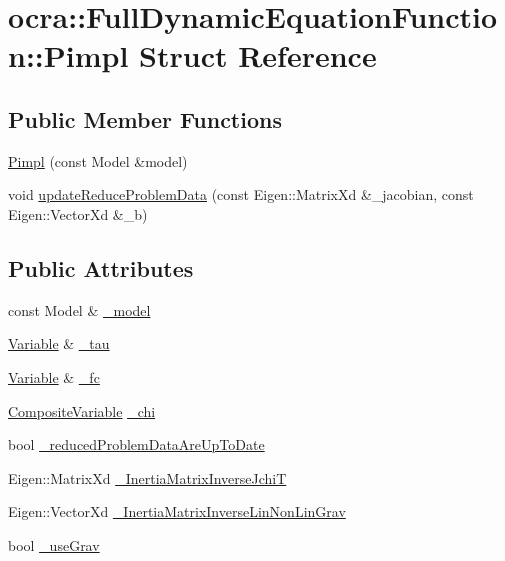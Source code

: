 \hypertarget{structFullDynamicEquationFunction_1_1Pimpl}{}\section{ocra\+:\+:Full\+Dynamic\+Equation\+Function\+:\+:Pimpl Struct Reference}
\label{structFullDynamicEquationFunction_1_1Pimpl}
\subsection*{Public Member Functions}
\begin{DoxyCompactItemize}
\item 
\hyperlink{structFullDynamicEquationFunction_1_1Pimpl_acc3b35606d52aa163f27d80f49cb3aaf}{Pimpl} (const Model \&model)
\item 
void \hyperlink{structFullDynamicEquationFunction_1_1Pimpl_a4d1df4cadec603942aeb750212a2d258}{update\+Reduce\+Problem\+Data} (const Eigen\+::\+Matrix\+Xd \&\+\_\+jacobian, const Eigen\+::\+Vector\+Xd \&\+\_\+b)
\end{DoxyCompactItemize}
\subsection*{Public Attributes}
\begin{DoxyCompactItemize}
\item 
const Model \& \hyperlink{structFullDynamicEquationFunction_1_1Pimpl_a180b0f0401cc9ff23b24d974823215d9}{\+\_\+model}
\item 
\hyperlink{classocra_1_1Variable}{Variable} \& \hyperlink{structFullDynamicEquationFunction_1_1Pimpl_a952d62f65cebf67e50d0d6a091f937c4}{\+\_\+tau}
\item 
\hyperlink{classocra_1_1Variable}{Variable} \& \hyperlink{structFullDynamicEquationFunction_1_1Pimpl_ab19caa3b14b35bba6a5dc5ea490cb7b4}{\+\_\+fc}
\item 
\hyperlink{classocra_1_1CompositeVariable}{Composite\+Variable} \hyperlink{structFullDynamicEquationFunction_1_1Pimpl_a795bb07591fdf52c4b60cccfb6b3e811}{\+\_\+chi}
\item 
bool \hyperlink{structFullDynamicEquationFunction_1_1Pimpl_a2712281ce355bde0730d888d8e92b2f8}{\+\_\+reduced\+Problem\+Data\+Are\+Up\+To\+Date}
\item 
Eigen\+::\+Matrix\+Xd \hyperlink{structFullDynamicEquationFunction_1_1Pimpl_a66a532ac843e6bb0255918262e48a947}{\+\_\+\+Inertia\+Matrix\+Inverse\+JchiT}
\item 
Eigen\+::\+Vector\+Xd \hyperlink{structFullDynamicEquationFunction_1_1Pimpl_a5b5154c8b3e5725507192b9055e2b298}{\+\_\+\+Inertia\+Matrix\+Inverse\+Lin\+Non\+Lin\+Grav}
\item 
bool \hyperlink{structFullDynamicEquationFunction_1_1Pimpl_a7a8eb59e31eca20e45bd63f2975ff27b}{\+\_\+use\+Grav}
\end{DoxyCompactItemize}


